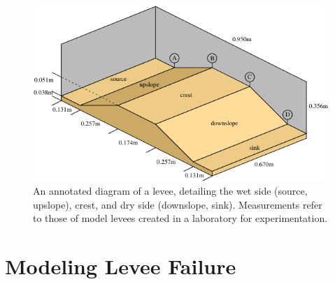 \begin{figure}[t]
  \centering
  \begin{minipage}{0.99\textwidth}
    \includegraphics[width=1.0\textwidth]{images/levee_diagram.pdf}
  \end{minipage}
  \caption[Annotated diagram of a levee]{An annotated diagram of a levee, detailing the wet side (source, upslope), crest, and dry side (downslope, sink). Measurements refer to those of model levees created in a laboratory for experimentation.}
  \label{figure:levee_diagram}
\end{figure}



\section{Modeling Levee Failure}
\label{section:ModelingLeveeFailure}

